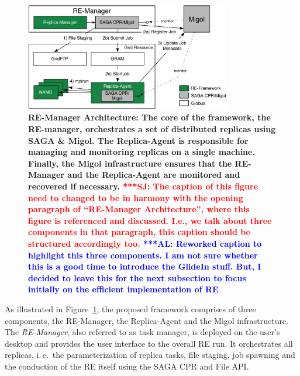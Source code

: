 \documentclass{rspublic}
\newcommand{\alnote}[1]{ {\textcolor{blue} { ***AL: #1 }}}
\newcommand{\jhanote}[1]{ {\textcolor{red} { ***SJ: #1 }}}
\newcommand{\alnote}[1]{}
\newcommand{\jhanote}[1]{}
\begin{document}
\begin{figure}[t]
      \centering
          \includegraphics[width=0.8\textwidth]{REMDgManager-architecture.pdf}
          \caption{\footnotesize \bf RE-Manager Architecture: The
            core of the framework, the RE-manager, orchestrates 
            a set of distributed replicas using SAGA \& Migol. 
            The Replica-Agent is responsible for managing and monitoring 
            replicas on a single machine. Finally, the Migol 
            infrastructure ensures that the RE-Manager and the Replica-Agent 
            are monitored and recovered if necessary.            
            \jhanote{The caption of this
              figure need to changed to be in harmony with the opening
              paragraph of ``RE-Manager Architecture'', where this
              figure is referenced and discussed. I.e., we talk about
              three components in that paragraph, this caption should
              be structured accordingly too.}
              \alnote{Reworked caption to highlight this three components. 
              I am not sure whether this is a good time to introduce the GlideIn stuff. But, I 
              decided to leave this for the next subsection to focus initially on
              the efficient implementation of RE}
              }
      \label{fig:REMD-Manager-architecture}
\end{figure}

As illustrated in Figure~\ref{fig:REMD-Manager-architecture}, the
proposed framework comprises of three components, the RE-Manager,
the Replica-Agent and the Migol infrastructure. 
The  \emph{RE-Manager}, also referred to as task manager,
is deployed on the user's desktop and provides the user interface 
to the overall RE run. It orchestrates all replicas, i.\,e.\ the 
parameterization of replica  tasks, file staging, job spawning 
and the conduction of the RE itself using the SAGA CPR
and File API.                                                                
\end{document}
